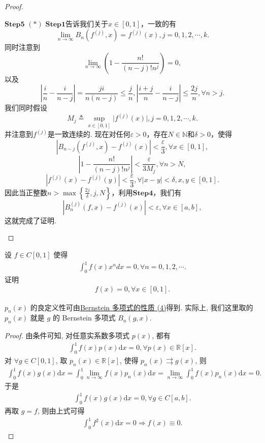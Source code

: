\documentclass[../../main.tex]{subfiles}
\begin{document}
\begin{proof}
\begin{enumerate}[(1)]
$\mathbf{Step}\mathbf{5}$ \((*)\) $\mathbf{Step}\mathbf{1}$告诉我们关于\(x\in[0,1]\)，一致的有
\[
\lim_{n\rightarrow\infty}B_n\left(f^{(j)},x\right)=f^{(j)}(x),j = 0,1,2,\cdots,k.
\]
同时注意到
\[
\lim_{n\rightarrow\infty}\left(1-\frac{n!}{(n - j)!n^j}\right)=0,
\]
以及
\[
\left|\frac{i}{n}-\frac{i}{n - j}\right|=\frac{ji}{n(n - j)}\leqslant\frac{j}{n},\left|\frac{i + j}{n}-\frac{i}{n - j}\right|\leqslant\frac{2j}{n},\forall n>j.
\]
我们同时假设
\[
M_j\triangleq\sup_{x\in[0,1]}\vert f^{(j)}(x)\vert,j = 0,1,2,\cdots,k.
\]
并注意到\(f^{(j)}\)是一致连续的.
现在对任何\(\varepsilon>0\)，存在\(N\in\mathbb{N}\)和\(\delta>0\)，使得
\[
\left|B_{n - j}\left(f^{(j)},x\right)-f^{(j)}(x)\right|<\frac{\varepsilon}{3},\forall x\in[0,1],
\]
\[
\left|1-\frac{n!}{(n - j)!n^j}\right|<\frac{\varepsilon}{3M_j},\forall n>N,
\]
\[
\left|f^{(j)}(x)-f^{(j)}(y)\right|<\frac{\varepsilon}{3},\forall\vert x - y\vert<\delta,x,y\in[0,1].
\]
因此当正整数\(n>\max\left\{\frac{2j}{\delta},j,N\right\}\)，利用$\mathbf{Step}\mathbf{4}$，我们有
\[
\left|B_n^{(j)}(f,x)-f^{(j)}(x)\right|<\varepsilon,\forall x\in[a,b],
\]
这就完成了证明. 
\end{enumerate}
\end{proof}

\begin{example}
设 $f \in C[0,1]$ 使得 
\begin{align*}
\int_{0}^{1} f(x)x^{n}dx = 0, \forall n = 0,1,2,\cdots.
\end{align*}
证明
\begin{align*}
f(x) = 0, \forall x \in [0,1].
\end{align*} 
\end{example}
\begin{remark}
$p_n(x)$ 的良定义性可由\hyperref[theorem:Bernstein多项式的性质]{Bernstein 多项式的性质 (4)}得到. 实际上, 我们这里取的 $p_n(x)$ 就是 $g$ 的 Bernstein 多项式 $B_n(g,x)$.
\end{remark}
\begin{proof}
由条件可知, 对任意实系数多项式 $p(x)$, 都有
\begin{align*}
\int_0^1 f(x) p(x) \mathrm{d}x = 0, \forall p(x) \in \mathbb{R}[x].
\end{align*}
对 $\forall g \in C[0,1]$, 取 $p_n(x) \in \mathbb{R}[x]$, 使得 $p_n(x) \rightrightarrows g(x)$, 则
\begin{align*}
\int_0^1 f(x) g(x) \mathrm{d}x = \int_0^1 \lim_{n\rightarrow \infty} f(x) p_n(x) \mathrm{d}x = \lim_{n\rightarrow \infty} \int_0^1 f(x) p_n(x) \mathrm{d}x = 0.
\end{align*}
于是
\begin{align*}
\int_0^1 f(x) g(x) \mathrm{d}x = 0, \forall g \in C[a,b].
\end{align*}
再取 $g = f$, 则由上式可得
\begin{align*}
\int_0^1 f^2(x) \mathrm{d}x = 0 \Rightarrow f(x) \equiv 0.
\end{align*}
\end{proof}
\end{document}
